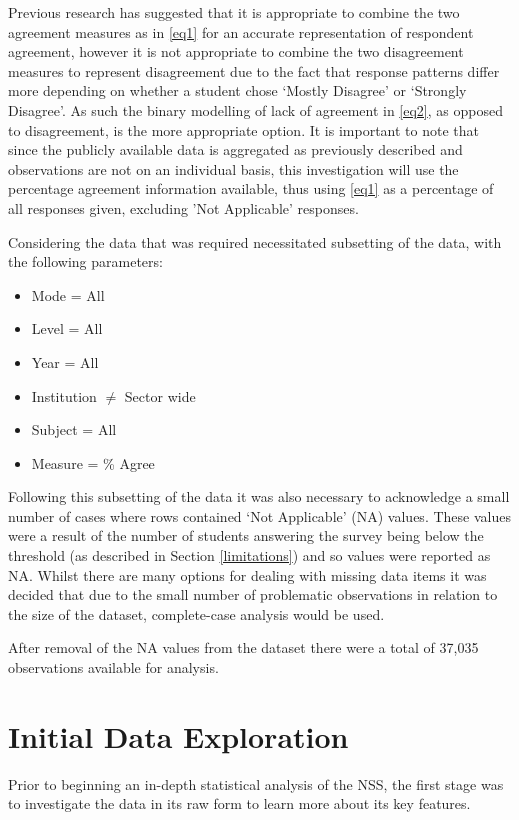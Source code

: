 \documentclass[11pt,a4paper]{report}
\begin{document}
Previous research has suggested that it is appropriate to combine the two agreement measures as in \eqref{eq1} for an accurate representation of respondent agreement, however it is not appropriate to combine the two disagreement measures to represent disagreement \cite{HEFCEdata} due to the fact that response patterns differ more depending on whether a student chose `Mostly Disagree' or `Strongly Disagree'. As such the binary modelling of lack of agreement in \eqref{eq2}, as opposed to disagreement, is the more appropriate option. It is important to note that since the publicly available data is aggregated as previously described and observations are not on an individual basis, this investigation will use the percentage agreement information available, thus using \eqref{eq1} as a percentage of all responses given, excluding 'Not Applicable' responses. 

Considering the data that was required necessitated subsetting of the data, with the following parameters:
\begin{itemize}
\item Mode = All
\item Level = All
\item Year = All
\item Institution $\neq$ Sector wide
\item Subject = All
\item Measure = \% Agree
\end{itemize}


Following this subsetting of the data it was also necessary to acknowledge a small number of cases where rows contained `Not Applicable' (NA) values. These values were a result of the number of students answering the survey being below the threshold (as described in Section \ref{limitations}) and so values were reported as NA. Whilst there are many options for dealing with missing data items it was decided that due to the small number of problematic observations in relation to the size of the dataset, complete-case analysis would be used. 

After removal of the NA values from the dataset there were a total of 37,035 observations available for analysis. 

\section{Initial Data Exploration} \label{dataexplore}
Prior to beginning an in-depth statistical analysis of the \ac{NSS}, the first stage was to investigate the data in its raw form to learn more about its key features.
\end{document}
